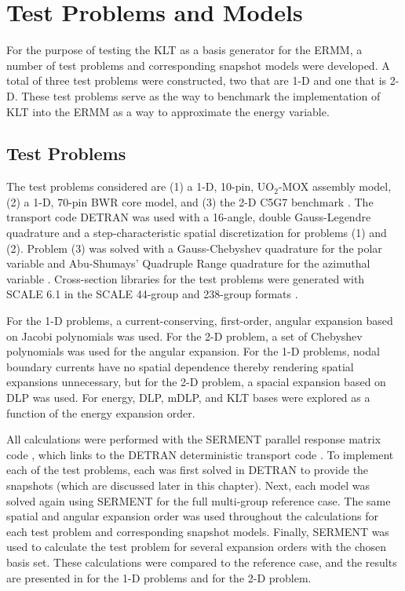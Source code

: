 
\chapter{Test Problems and Models} %

\label{Chapter4}


For the purpose of testing the KLT as a basis generator for the ERMM, a number 
of test problems and corresponding snapshot models were developed. A total of 
three test problems were constructed, two that are 1-D and one that is 2-D.  
These test problems serve as the way to benchmark the implementation of 
KLT into the ERMM as a way to approximate the energy variable.

\section{Test Problems}

The test problems considered are (1) a 1-D, 10-pin, UO$_2$-MOX 
assembly model, (2) a 1-D, 70-pin BWR core model, and (3) the 2-D C5G7 benchmark
\citep{C5G7}. The transport code DETRAN was used with a 16-angle, 
double Gauss-Legendre quadrature and a step-characteristic spatial 
discretization for problems (1) and (2). Problem (3) was solved with a  
Gauss-Chebyshev quadrature for the polar variable and Abu-Shumays' 
Quadruple Range quadrature for the azimuthal variable \citep{Roberts2014}. 
Cross-section libraries for the test problems were generated with SCALE 6.1 in 
the SCALE 44-group and 238-group formats \citep{Scale}.

For the 1-D problems, a current-conserving, first-order, angular expansion 
based on Jacobi polynomials \citep{Roberts2014} was used.  For the 2-D 
problem, a set of Chebyshev polynomials was used for the angular expansion. For 
the 1-D problems, nodal boundary currents have no spatial dependence thereby 
rendering spatial expansions unnecessary, but for the 2-D problem, a spacial 
expansion based on DLP was used. For energy, DLP, mDLP, and KLT bases were 
explored as a function of the energy expansion order.

All calculations were performed with the SERMENT parallel response matrix 
code \citep{RobertsSerment}, which links to the DETRAN deterministic 
transport code \citep{RobertsDetran}.  To implement each of the test problems, 
each was first solved in DETRAN to provide the snapshots (which are 
discussed later in this chapter).  Next, each model was solved again using 
SERMENT for the full multi-group reference case.  The same spatial and angular 
expansion order was used throughout the calculations for each test problem and 
corresponding snapshot models. Finally, SERMENT was used to calculate the 
test problem for several expansion orders with the chosen basis set.  These 
calculations were compared to the reference case, and the results are presented 
in  for the 1-D problems and  for the 2-D 
problem.

